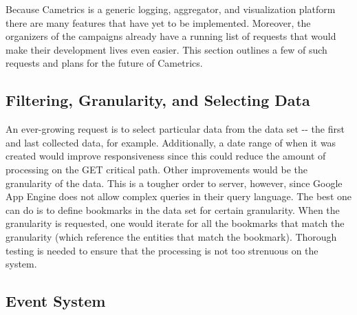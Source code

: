 \documentclass[10pt,a4paper,english]{article}
\begin{document}
Because Cametrics is a generic logging, aggregator, and visualization platform there are many features that have yet to be implemented. Moreover, the organizers of the campaigns already have a running list of requests that would make their development lives even easier. This section outlines a few of such requests and plans for the future of Cametrics.



\hypertarget{filtering-granularity-and-selecting-data}{}
\subsection*{Filtering, Granularity, and Selecting Data}
\label{filtering-granularity-and-selecting-data}

An ever-growing request is to select particular data from the data set -{}- the first and last collected data, for example. Additionally, a date range of when it was created would improve responsiveness since this could reduce the amount of processing on the GET critical path. Other improvements would be the granularity of the data. This is a tougher order to server, however, since Google App Engine does not allow complex queries in their query language. The best one can do is to define bookmarks in the data set for certain granularity. When the granularity is requested, one would iterate for all the bookmarks that match the granularity (which reference the entities that match the bookmark). Thorough testing is needed to ensure that the processing is not too strenuous on the system.



\hypertarget{event-system}{}
\subsection*{Event System}
\label{event-system}
\end{document}
